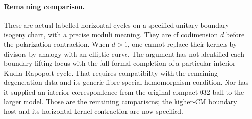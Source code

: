 \paragraph{Remaining comparison.}
These are actual labelled horizontal cycles on a specified
unitary boundary isogeny chart, with a precise moduli
meaning. They are of codimension $d$ before the
polarization contraction. When $d>1$, one cannot replace
their kernels by divisors by analogy with an elliptic
curve. The argument has not identified each boundary
lifting locus with the full formal completion of a
particular interior Kudla--Rapoport cycle. That requires
compatibility with the remaining degeneration data and
its generic-fibre special-homomorphism condition. Nor
has it supplied an interior correspondence from the
original compact 032 ball to the larger model. Those
are the remaining comparisons; the higher-CM boundary
host and its horizontal kernel contraction are now
specified.

